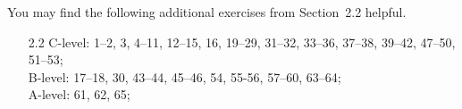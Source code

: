 \documentclass{article}
\begin{document}
\noindent
You may find the following additional exercises from Section~2.2 helpful.
\begin{itemize}
\item[2.2] 
  C-level: 1--2, 3, 4--11, 12--15, 16, 19--29, 31--32, 33--36, 37--38,
  39--42, 47--50, 51--53; \\
  B-level: 17--18, 30, 43--44, 45--46, 54, 55-56, 57--60, 63--64; \\
  A-level: 61, 62, 65;
\end{itemize}
\end{document}
